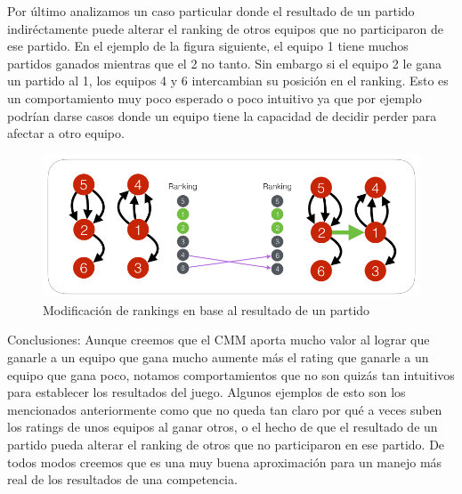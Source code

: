 Por \'ultimo analizamos un caso particular donde el resultado de un partido indir\'ectamente puede alterar el ranking de otros equipos que no participaron de ese partido. En el ejemplo de la figura siguiente, el equipo 1 tiene muchos partidos ganados mientras que el 2 no tanto. Sin embargo si el equipo 2 le gana un partido al 1, los equipos 4 y 6 intercambian su posici\'on en el ranking. Esto es un comportamiento muy poco esperado o poco intuitivo ya que por ejemplo podr\'ian darse casos donde un equipo tiene la capacidad de decidir perder para afectar a otro equipo.

\begin{figure}[h!]
  \begin{center}
	\includegraphics[scale=0.50]{imagenes/cualitative/fairness/fairness4.png}
	\caption{Modificaci\'on de rankings en base al resultado de un partido}
  \end{center}
\end{figure}

Conclusiones: Aunque creemos que el CMM aporta mucho valor al lograr que ganarle a un equipo que gana mucho aumente m\'as el rating que ganarle a un equipo que gana poco, notamos comportamientos que no son quiz\'as tan intuitivos para establecer los resultados del juego. Algunos ejemplos de esto son los mencionados anteriormente como que no queda tan claro por qu\'e a veces suben los ratings de unos equipos al ganar otros, o el hecho de que el resultado de un partido pueda alterar el ranking de otros que no participaron en ese partido. De todos modos creemos que es una muy buena aproximaci\'on para un manejo m\'as real de los resultados de una competencia.

